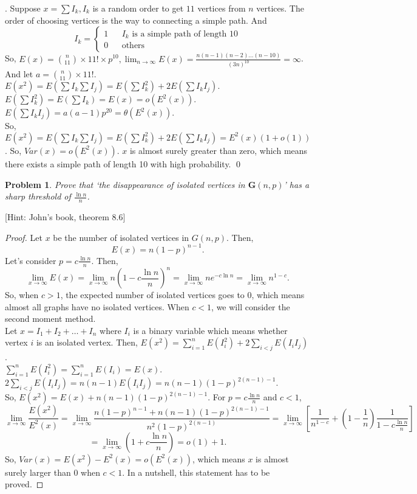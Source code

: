 \documentclass[12pt]{article}
\newtheorem{hw}{Problem}
\newenvironment{sol}
  {\par\vspace{3mm}\noindent{\it Solution}.}
  {\qed}
\begin{document}
\begin{sol}
    Suppose $x=\sum I_k, I_k$ is a random order to get $11$ vertices from $n$ vertices. The order of choosing vertices is the way to connecting a simple path. And 
    $$ I_k=\left\{
\begin{array}{rcl}
1       &      & I_k\text{ is a simple path of length 10}\\
0     &      & \text{others}
\end{array} \right. $$ 
    So, $E(x) = \binom{n}{11}\times 11! \times p^{10},\lim_{n \to \infty} E(x) = \frac{n(n-1)(n-2)\ldots (n-10)}{(3n)^{10}} = \infty $. And let $a = \binom{n}{11}\times 11!$.\\
    $E(x^2) = E(\sum I_k \sum I_j)= E(\sum I_k^2)+2E(\sum I_k I_j).$\\
    $E(\sum I_k^2) = E(\sum I_k) =E(x) = o(E^2(x))$.\\
    $E(\sum I_k I_j) = a(a-1)p^{20} = \theta (E^2(x))$.\\
    So, $E(x^2) = E(\sum I_k \sum I_j)= E(\sum I_k^2)+2E(\sum I_k I_j)=E^2(x)(1+o(1))$. So, $Var(x) = o(E^2(x))$. $x$ is almost surely greater than zero, which means there exists a simple path of length 10 with high probability.
\end{sol}


\begin{hw}
Prove that `the disappearance of isolated vertices in $\mathbf{G}(n,p)$' has a sharp threshold of $\frac{\ln n}{n}$.
\end{hw}
[Hint: John's book, theorem 8.6]

\begin{proof}
    Let $x$ be the number of isolated vertices in $G(n,p)$. Then, 
    \[ E(x) = n(1-p)^{n-1}. \]
    Let's consider $p = c \frac{\ln n}{n}$. Then,
    \[ \lim_{x \to \infty} E(x) = \lim_{x \to \infty} n(1-c\frac{\ln n}{n})^n = \lim_{x \to \infty} ne^{-c\ln n} =\lim_{x \to \infty} n^{1-c} .    \]
    So, when $c>1$, the expected number of isolated vertices goes to $0$, which means almost all graphs have no isolated vertices.
    When $c<1$, we will consider the second moment method.\\
    Let $x = I_1+I_2+\ldots +I_n$ where $I_i$ is a binary variable which means whether vertex $i$ is an isolated vertex. Then, $E(x^2) = \sum_{i = 1}^{n} E(I_i^2) + 2\sum_{i<j} E(I_iI_j)  $.\\
    $\sum_{i = 1}^{n} E(I_i^2) = \sum_{i = 1}^{n} E(I_i) = E(x)$.\\
    $2\sum_{i<j} E(I_iI_j)=n(n-1)E(I_iI_j)= n(n-1)(1-p)^{2(n-1)-1}$.\\
    So, $E(x^2) = E(x) + n(n-1)(1-p)^{2(n-1)-1}$. For $p = c\frac{\ln n}{n}$ and $c<1$,
    \[ \lim_{x \to \infty} \frac{E(x^2)}{E^2(x)} = \lim_{x \to \infty} \frac{n(1-p)^{n-1}+n(n-1)(1-p)^{2(n-1)-1}}{n^2(1-p)^{2(n-1)}} = \lim_{x \to \infty} [\frac{1}{n^{1-c}}+(1-\frac{1}{n})\frac{1}{1-c\frac{\ln n}{n}}]   \]
    \[= \lim_{x \to \infty} (1+c\frac{\ln n}{n}) = o(1)+1 .\]
    So, $Var(x)= E(x^2) - E^2(x) = o(E^2(x))$, which means $x$ is almost surely larger than $0$ when $c<1$. In a nutshell, this statement has to be proved.
\end{proof}
\end{document}
